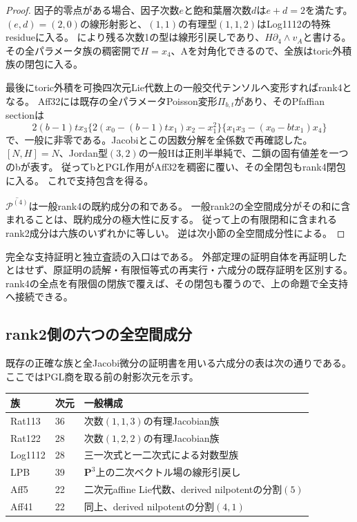 \documentclass[a4paper,11pt]{ltjsarticle}
\theoremstyle{definition}
\newcommand{\PP}{\mathbf P}
\begin{document}
\begin{proof}
因子的零点がある場合、因子次数\(e\)と飽和葉層次数\(d\)は\(e+d=2\)を満たす。
\((e,d)=(2,0)\)の線形射影と、\((1,1)\)の有理型\((1,1,2)\)はLog1112の特殊residueに入る。
\cite{lpt}により残る次数1の型は線形引戻しであり、\(H\partial_4\wedge v_A\)と書ける。
その全パラメータ族の稠密開で\(H=x_4\)、Aを対角化できるので、全族はtoric外積族の閉包に入る。

最後にtoric外積を可換四次元Lie代数上の一般交代テンソルへ変形すればrank4となる。
Aff32には既存の全パラメータPoisson変形\(\Pi_{b,t}\)があり、そのPfaffian sectionは
\[
2(b-1)t x_3\{2(x_0-(b-1)tx_1)x_2-x_1^2\}
\{x_1x_3-(x_0-btx_1)x_4\}
\]
で、一般に非零である。Jacobiとこの因数分解を全係数で再確認した。
\([N,H]=N\)、Jordan型\((3,2)\)の一般Hは正則半単純で、二鎖の固有値差を一つのbが表す。
従ってbとPGL作用がAff32を稠密に覆い、その全閉包もrank4閉包に入る。
これで支持包含を得る。

\(\overline{\mathcal P^{(4)}}\)は一般rank4の既約成分の和である。
一般rank2の全空間成分がその和に含まれることは、既約成分の極大性に反する。
従って上の有限閉和に含まれるrank2成分は六族のいずれかに等しい。
逆は次小節の全空間成分性による。
\end{proof}

完全な支持証明と独立査読の入口はである。
外部定理の証明自体を再証明したとはせず、原証明の読解・有限恒等式の再実行・六成分の既存証明を区別する。
rank4の全点を有限個の閉族で覆えば、その閉包も覆うので、上の命題で全支持へ接続できる。

\subsection{rank2側の六つの全空間成分}
既存の正確な族と全Jacobi微分の証明書を用いる六成分の表は次の通りである。
ここではPGL商を取る前の射影次元を示す。
\begin{center}
\begin{tabular}{lll}
\toprule
族&次元&一般構成\\
\midrule
Rat113&36&次数$(1,1,3)$の有理Jacobian族\\
Rat122&28&次数$(1,2,2)$の有理Jacobian族\\
Log1112&28&三一次式と一二次式による対数型族\\
LPB&39&$\PP^3$上の二次ベクトル場の線形引戻し\\
Aff5&22&二次元affine Lie代数、derived nilpotentの分割$(5)$\\
Aff41&22&同上、derived nilpotentの分割$(4,1)$\\
\bottomrule
\end{tabular}
\end{center}
\end{document}
